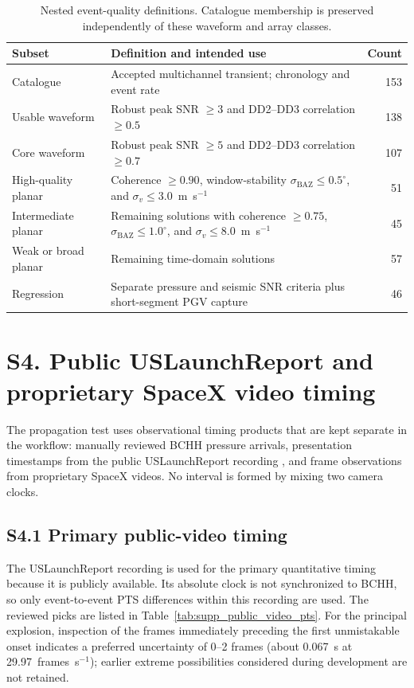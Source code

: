 \documentclass[]{seismica}
\begin{document}
\begin{table}[!tbp]
\centering
\caption{Nested event-quality definitions. Catalogue membership is preserved
independently of these waveform and array classes.}
\label{tab:supp_quality}
\begin{tabularx}{\textwidth}{lXr}
\hline
Subset & Definition and intended use & Count \\
\hline
Catalogue & Accepted multichannel transient; chronology and event rate & 153 \\
Usable waveform & Robust peak SNR $\geq3$ and DD2--DD3 correlation $\geq0.5$ & 138 \\
Core waveform & Robust peak SNR $\geq5$ and DD2--DD3 correlation $\geq0.7$ & 107 \\
High-quality planar & Coherence $\geq0.90$, window-stability
$\sigma_{\mathrm{BAZ}}\leq0.5^\circ$, and
$\sigma_v\leq3.0$~m~s$^{-1}$ & 51 \\
Intermediate planar & Remaining solutions with coherence $\geq0.75$,
$\sigma_{\mathrm{BAZ}}\leq1.0^\circ$, and
$\sigma_v\leq8.0$~m~s$^{-1}$ & 45 \\
Weak or broad planar & Remaining time-domain solutions & 57 \\
Regression & Separate pressure and seismic SNR criteria plus short-segment PGV capture & 46 \\
\hline
\end{tabularx}
\end{table}

\FloatBarrier

\section*{S4. Public USLaunchReport and proprietary SpaceX video timing}
\label{sec:supp_timing}

The propagation test uses observational timing products that are kept separate
in the workflow: manually reviewed BCHH pressure arrivals, presentation
timestamps from the public USLaunchReport recording
\citep{uslaunchreport_amos6_video_2016}, and frame observations from proprietary
SpaceX videos. No interval is formed by mixing two camera clocks.

\subsection*{S4.1 Primary public-video timing}

The USLaunchReport recording is used for the primary quantitative timing
because it is publicly available. Its absolute clock is not synchronized to
BCHH, so only event-to-event PTS differences within this recording are used.
The reviewed picks are listed in Table~\ref{tab:supp_public_video_pts}. For
the principal explosion, inspection of the frames immediately preceding the
first unmistakable onset indicates a preferred uncertainty of 0--2 frames
(about 0.067~s at 29.97~frames~s$^{-1}$); earlier extreme possibilities
considered during development are not retained.
\end{document}
